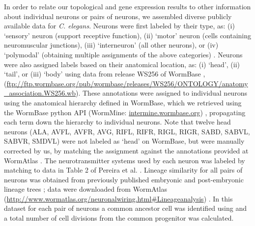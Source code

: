 \documentclass[10pt,letterpaper]{article}
\begin{document}
In order to relate our topological and gene expression results to other information about individual neurons or pairs of neurons, we assembled diverse publicly available data for \emph{C. elegans}.
Neurons were first labeled by their type, as:
(i) `sensory' neuron (support receptive function),
(ii) `motor' neuron (cells containing neuromuscular junctions),
(iii) `interneuron' (all other neurons), or
(iv) `polymodal' (obtaining multiple assignments of the above categories) \cite{White:1986tx}.
Neurons were also assigned labels based on their anatomical location, as:
(i) `head', (ii) `tail', or (iii) `body' using data from release WS256 of WormBase \cite{Harris:2009kd}, (\url{ftp://ftp.wormbase.org/pub/wormbase/releases/WS256/ONTOLOGY/anatomy_association.WS256.wb}).
These annotations were assigned to individual neurons using the anatomical hierarchy defined in WormBase, which we retrieved using the WormBase python API (WormMine: \url{intermine.wormbase.org}) \cite{Harris:2009kd}, propagating each term down the hierarchy to individual neurons.
Note that twelve head neurons (ALA, AVFL, AVFR, AVG, RIFL, RIFR, RIGL, RIGR, SABD, SABVL, SABVR, SMDVL) were not labeled as `head' on WormBase, but were manually corrected by us, by matching the assignment against the annotations provided at WormAtlas \cite{WormAtlas}.
The neurotransmitter systems used by each neuron was labeled by matching to data in Table 2 of Pereira et al. \cite{Pereira:2015er}.
Lineage similarity for all pairs of neurons was obtained from previously published embryonic and post-embryonic lineage trees \cite{Sulston1977, Sulston1983}; data were downloaded from WormAtlas (\url{http://www.wormatlas.org/neuronalwiring.html#Lineageanalysis}) \cite{WormAtlas}.
In this dataset for each pair of neurons a common ancestor cell was identified using and a total number of cell divisions from the common progenitor was calculated.
\end{document}
